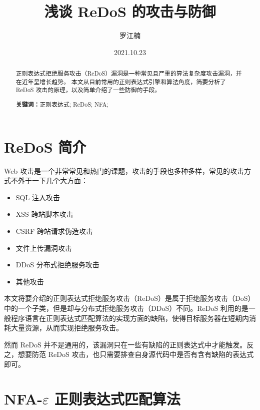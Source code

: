\documentclass[hyperref,UTF8,12pt,a4paper]{ctexart}
\title{浅谈 ReDoS 的攻击与防御}
\author{罗江楠}
\date{2021.10.23}
\begin{document}
\maketitle

\newpage

\tableofcontents

\newpage

\begin{abstract}

\vspace{\baselineskip}

正则表达式拒绝服务攻击（ReDoS）漏洞是一种常见且严重的算法复杂度攻击漏洞，并在近年呈增长趋势。
本文从目前常用的正则表达式引擎和算法角度，简要分析了 ReDoS 攻击的原理，以及简单介绍了一些防御的手段。

\par\textbf{关键词：}正则表达式; ReDoS; NFA;

\end{abstract}

\newpage

\section{ReDoS 简介}

Web 攻击是一个非常常见和热门的课题，攻击的手段也多种多样，常见的攻击方式不外于一下几个大方面：

\begin{itemize}
\item SQL 注入攻击
\item XSS 跨站脚本攻击
\item CSRF 跨站请求伪造攻击
\item 文件上传漏洞攻击
\item DDoS 分布式拒绝服务攻击
\item 其他攻击
\end{itemize}

本文将要介绍的正则表达式拒绝服务攻击（ReDoS）是属于拒绝服务攻击（DoS）中的一个子类，但是却与分布式拒绝服务攻击（DDoS）不同。ReDoS 利用的是一般程序语言在正则表达式匹配算法的实现方面的缺陷，使得目标服务器在短期内消耗大量资源，从而实现拒绝服务攻击。

然而 ReDoS 并不是通用的，该漏洞只在一些有缺陷的正则表达式中才能触发。反之，想要防范 ReDoS 攻击，也只需要排查自身源代码中是否有含有缺陷的表达式即可。

\section{NFA-$\varepsilon$ 正则表达式匹配算法}
\end{document}
